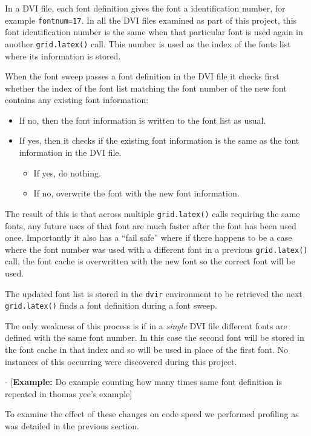 \documentclass[]{article}
\begin{document}
In a DVI file, each font definition gives the font a identification
number, for example \texttt{fontnum=17}. In all the DVI files examined
as part of this project, this font identification number is the same
when that particular font is used again in another \texttt{grid.latex()}
call. This number is used as the index of the fonts list where its
information is stored.

When the font sweep passes a font definition in the DVI file it checks
first whether the index of the font list matching the font number of the
new font contains any existing font information:

\begin{itemize}
  \item If no, then the font information is written to the font list as usual.
  \item If yes, then it checks if the existing font information is the same as the font information in the DVI file. 
  \begin{itemize}
    \item If yes, do nothing. 
    \item If no, overwrite the font with the new font information.
  \end{itemize}
\end{itemize}

The result of this is that across multiple \texttt{grid.latex()} calls
requiring the same fonts, any future uses of that font are much faster
after the font has been used once. Importantly it also has a ``fail
safe'' where if there happens to be a case where the font number was
used with a different font in a previous \texttt{grid.latex()} call, the
font cache is overwritten with the new font so the correct font will be
used.

The updated font list is stored in the \texttt{dvir} environment to be
retrieved the next \texttt{grid.latex()} finds a font definition during
a font sweep.

The only weakness of this process is if in a \emph{single} DVI file
different fonts are defined with the same font number. In this case the
second font will be stored in the font cache in that index and so will
be used in place of the first font. No instances of this occurring were
discovered during this project.

- {[}\textbf{Example:} Do example counting how many times same font
definition is repeated in thomas yee's example{]}

To examine the effect of these changes on code speed we performed
profiling as was detailed in the previous section.
\end{document}
